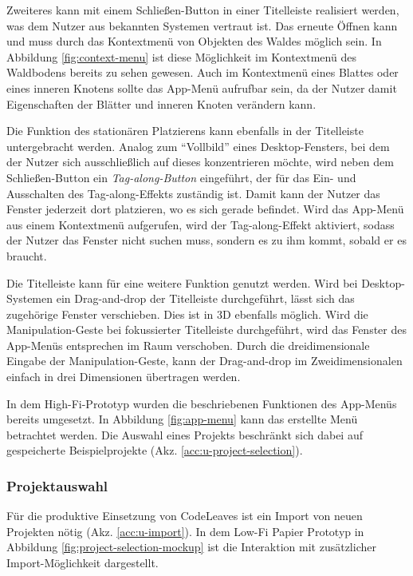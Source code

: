 Zweiteres kann mit einem Schließen-Button in einer Titelleiste realisiert werden, was dem Nutzer aus bekannten Systemen vertraut ist. Das erneute Öffnen kann und muss durch das Kontextmenü von Objekten des Waldes möglich sein. In Abbildung \ref{fig:context-menu} ist diese Möglichkeit im Kontextmenü des Waldbodens bereits zu sehen gewesen. Auch im Kontextmenü eines Blattes oder eines inneren Knotens sollte das App-Menü aufrufbar sein, da der Nutzer damit Eigenschaften der Blätter und inneren Knoten verändern kann.

Die Funktion des stationären Platzierens kann ebenfalls in der Titelleiste untergebracht werden. Analog zum "`Vollbild"' eines Desktop-Fensters, bei dem der Nutzer sich ausschließlich auf dieses konzentrieren möchte, wird neben dem Schließen-Button ein \textit{Tag-along-Button} eingeführt, der für das Ein- und Ausschalten des Tag-along-Effekts zuständig ist. Damit kann der Nutzer das Fenster jederzeit dort platzieren, wo es sich gerade befindet. Wird das App-Menü aus einem Kontextmenü aufgerufen, wird der Tag-along-Effekt aktiviert, sodass der Nutzer das Fenster nicht suchen muss, sondern es zu ihm kommt, sobald er es braucht.

Die Titelleiste kann für eine weitere Funktion genutzt werden. Wird bei Desktop-Systemen ein Drag-and-drop der Titelleiste durchgeführt, lässt sich das zugehörige Fenster verschieben. Dies ist in 3D ebenfalls möglich. Wird die Manipulation-Geste bei fokussierter Titelleiste durchgeführt, wird das Fenster des App-Menüs entsprechen im Raum verschoben. Durch die dreidimensionale Eingabe der Manipulation-Geste, kann der Drag-and-drop im Zweidimensionalen einfach in drei Dimensionen übertragen werden.

In dem High-Fi-Prototyp wurden die beschriebenen Funktionen des App-Menüs bereits umgesetzt. In Abbildung \ref{fig:app-menu} kann das erstellte Menü betrachtet werden. Die Auswahl eines Projekts beschränkt sich dabei auf gespeicherte Beispielprojekte (Akz. \ref{acc:u-project-selection}).

\subsubsection*{Projektauswahl}

Für die produktive Einsetzung von CodeLeaves ist ein Import von neuen Projekten nötig (Akz. \ref{acc:u-import}). In dem Low-Fi Papier Prototyp in Abbildung \ref{fig:project-selection-mockup} ist die Interaktion mit zusätzlicher Import-Möglichkeit dargestellt.

